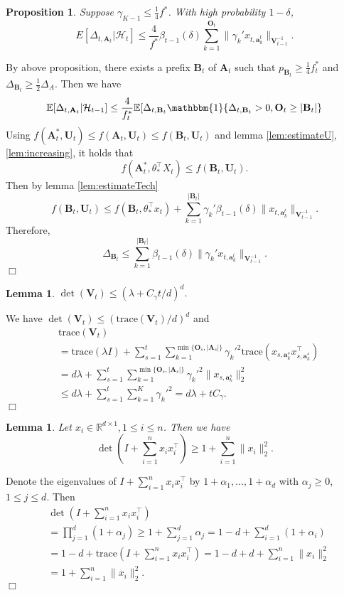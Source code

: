 \documentclass{article}
\newcommand{\EE}{\mathbb{E}}
\newcommand{\RR}{\mathbb{R}}
\newcommand{\bOne}{\mathbbm{1}}
\newcommand{\bA}{\mathbf{A}}
\newcommand{\ba}{\mathbf{a}}
\newcommand{\bB}{\mathbf{B}}
\newcommand{\bO}{\mathbf{O}}
\newcommand{\bU}{\mathbf{U}}
\newcommand{\bV}{\mathbf{V}}
\newcommand{\cH}{\mathcal{H}}
\newcommand{\trace}{\mathrm{trace}}
\newcommand{\abs}[1]{\left| #1 \right|}
\newcommand{\norm}[1]{\| #1 \|}
\newtheorem{proposition}[theorem]{Proposition}%
\newtheorem{lemma}[theorem]{Lemma}%
\newenvironment{proof}{\noindent {\textbf{Proof. }}}{$\Box$ \medskip}
\begin{document}
\begin{proposition}
Suppose $\gamma_{K-1} \leq \frac{1}{4} f^*$. With high probability $1-\delta$, 
$$
E[\Delta_{t, \bA_t}|\cH_t] \leq \frac{4}{f^*} \beta_{t-1}(\delta)\sum_{k=1}^{\bO_t}\norm{\gamma_k' x_{t,\ba_k^t}}_{\bV_{t-1}^{-1}}.
$$
\end{proposition}
\begin{proof}
By above proposition, there exists a prefix $\bB_t$ of $\bA_t$ such that $p_{\bB_t} \geq \frac{1}{4}f_t^*$ and $\Delta_{\bB_t} \geq \frac{1}{2}\Delta_A$. Then we have
$$
\EE[\Delta_{t, \bA_t} | \cH_{t-1}] \leq \frac{4}{f_t^*} \EE[\Delta_{t, \bB_t} \bOne\{\Delta_{t, \bB_t} > 0, \bO_t \geq \abs{\bB_t}\}
$$
Using $f(\bA_t^*,\bU_t) \leq f(\bA_t,\bU_t) \leq f(\bB_t,\bU_t)$ and lemma \ref{lem:estimateU}, \ref{lem:increasing}, it holds that
$$
f(\bA_t^*, \theta_*^{\top}X_t) \leq f(\bB_t,\bU_t).
$$
Then by lemma \ref{lem:estimateTech}
$$
f(\bB_t,\bU_t) \leq f(\bB_t, \theta_*^{\top}x_t) + \sum_{k=1}^{\abs{\bB_t}}\gamma_k'\beta_{t-1}(\delta)\norm{x_{t,\ba_k^t}}_{\bV_{t-1}^{-1}}.
$$
Therefore,
$$
\Delta_{\bB_t} \leq \sum_{k=1}^{\abs{\bB_t}}\beta_{t-1}(\delta)\norm{\gamma_k' x_{t,\ba_k^t}}_{\bV_{t-1}^{-1}}.
$$
\end{proof}
	
\begin{lemma} %
$\det(\bV_t) \leq (\lambda + C_\gamma t/d)^d.$
\end{lemma}
\begin{proof}
We have $\det(\bV_t) \leq (\trace(\bV_t)/d)^d$ and
\begin{align*}
&\trace(\bV_t)\\
& = \trace(\lambda I) + \sum_{s=1}^t \sum_{k=1}^{\min\{\bO_s,\abs{\bA_s}\}} \gamma_k'^2 \trace(x_{s,\ba_k^s} x_{s,\ba_k^s}^{\top})\\	
& = d \lambda + \sum_{s=1}^t \sum_{k=1}^{\min\{\bO_s,\abs{\bA_s}\}} \gamma_k'^2 \norm{x_{s,\ba_k^s}}_2^2\\
& \leq d \lambda + \sum_{s=1}^t\sum_{k=1}^{K}\gamma_k'^2=d\lambda + tC_\gamma.
\end{align*}
\end{proof}

\begin{lemma} %
Let $x_i \in \RR^{d \times 1}, 1 \leq i \leq n$. Then we have
$$
\det(I + \sum_{i=1}^n x_i x_i^{\top}) \geq 1 + \sum_{i=1}^n \norm{x_i}_2^2.
$$
\end{lemma}
\begin{proof}
Denote the eigenvalues of $I + \sum_{i=1}^n x_i x_i^{\top}$ by $1+\alpha_1,...,1+\alpha_d$ with $\alpha_j \geq 0$, $1\leq j\leq d$. Then
\begin{align*}
&\det(I + \sum_{i=1}^n x_i x_i^{\top})\\
&= \prod_{j=1}^d (1 + \alpha_j)\geq 1 +\sum_{j=1}^d \alpha_j =1-d + \sum_{i=1}^d (1+\alpha_i) \\
&=1-d + \trace(I + \sum_{i=1}^n x_i x_i^{\top})= 1-d + d + \sum_{i=1}^n \norm{x_i}_2^2\\
&=1 + \sum_{i=1}^n \norm{x_i}_2^2.
\end{align*}
\end{proof}
\end{document}
